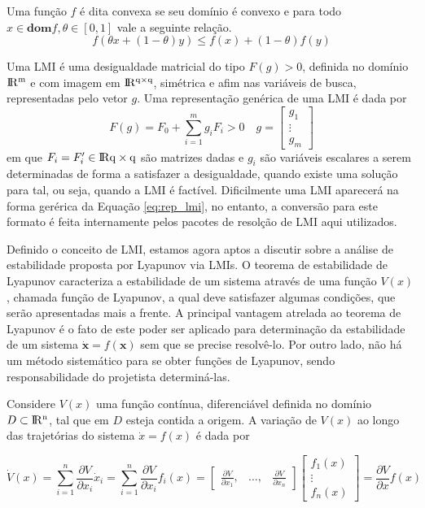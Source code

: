 Uma função $f$ é dita convexa se seu domínio é convexo e para todo $x \in \textbf{dom} f, \theta \in [0, 1]$ vale a seguinte relação.
\begin{equation*}
f(\theta x+(1-\theta)y) \leq f(x)+(1-\theta)f(y)
\end{equation*}

Uma LMI é uma desigualdade matricial do tipo $F(g) > 0$, definida no domínio $\rm I\!R^{m}$ e com imagem em $\rm I\!R^{q \times q}$, simétrica e afim nas variáveis de busca, representadas pelo vetor $g$. Uma representação genérica de uma LMI é dada por
\begin{equation}\label{eq:rep_lmi}
F(g) = F_0+\sum_{i = 1}^{m}g_iF_i>0\quad g = \begin{bmatrix}g_1\\\vdots\\g_m\end{bmatrix}
\end{equation}
em que $F_i = F_i' \in \rm I\!R{q \times q}$ são matrizes dadas e $g_i$ são variáveis escalares a serem determinadas de forma a satisfazer a desigualdade, quando existe uma solução para tal, ou seja, quando a LMI é factível. Dificilmente uma LMI aparecerá na forma gerérica da Equação \ref{eq:rep_lmi}, no entanto, a conversão para este formato é feita internamente pelos pacotes de resolção de LMI aqui utilizados.

Definido o conceito de LMI, estamos agora aptos a discutir sobre a análise de estabilidade proposta por Lyapunov via LMIs. O teorema de estabilidade de Lyapunov caracteriza a estabilidade de um sistema através de uma função $V(x)$, chamada função de Lyapunov, a qual deve satisfazer algumas condições, que serão apresentadas mais a frente. A principal vantagem atrelada ao teorema de Lyapunov é o fato de este poder ser aplicado para determinação da estabilidade de um sistema $\dot{\textbf{x}} = f(\textbf{x})$ sem que se precise resolvê-lo. Por outro lado, não há um método sistemático para se obter funções de Lyapunov, sendo responsabilidade do projetista determiná-las.

Considere $V(x)$ uma função contínua, diferenciável definida no domínio $D \subset \rm I\!R^{n}$, tal que em $D$ esteja contida a origem. A variação de $V(x)$ ao longo das trajetórias do sistema $\dot{x} = f(x)$ é dada por

\begin{equation*}
\dot{V}(x) = \sum_{i = 1}^{n} \frac{\partial V}{\partial x_i}\dot{x}_i = \sum_{i = 1}^{n} \frac{\partial V}{\partial x_i} f_i(x) = \begin{bmatrix}\frac{\partial V}{\partial x_1},&\hdots,&\frac{\partial V}{\partial x_n}\end{bmatrix}\begin{bmatrix}f_1(x)\\\vdots\\f_n(x)\end{bmatrix} = \frac{\partial V}{\partial x}f(x)
\end{equation*}

